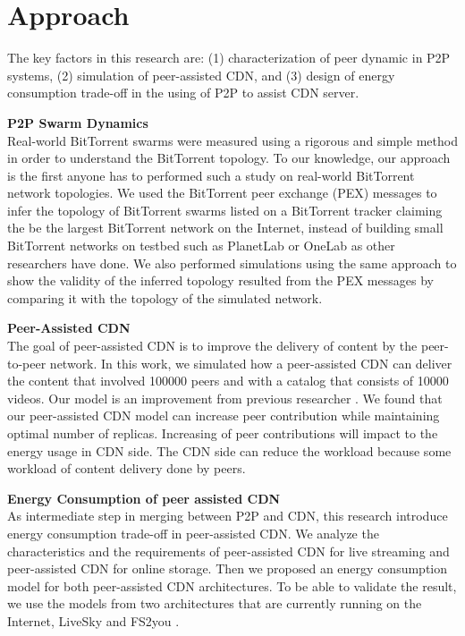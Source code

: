 \section{Approach}
The key factors in this research are: (1) characterization of peer dynamic in P2P systems, (2) simulation of peer-assisted CDN, and (3) design of energy consumption trade-off in the using of P2P to assist CDN server.

\textbf{P2P Swarm Dynamics}\\
Real-world BitTorrent swarms were measured using a rigorous and simple method in order to understand the BitTorrent topology. 
To our knowledge, our approach is the first anyone has to performed such a study on real-world BitTorrent network topologies. 
We used the BitTorrent peer exchange (PEX) messages to infer the topology of BitTorrent swarms listed on a BitTorrent tracker claiming the be the largest BitTorrent network on the Internet, instead of building small BitTorrent networks on testbed such as PlanetLab or OneLab as other researchers have done\cite{dale2008evolution}.
We also performed simulations using the same approach to show the validity of the inferred topology resulted from the PEX messages by comparing it with the topology of the simulated network.

\textbf{Peer-Assisted CDN}\\
The goal of peer-assisted CDN is to improve the delivery of content by the peer-to-peer network.  
In this work, we simulated how a peer-assisted CDN can deliver the content that involved 100000 peers and with a catalog that consists of 10000 videos.
Our model is an improvement from previous researcher \cite{1613869}.
We found that our peer-assisted CDN model can increase peer contribution while maintaining optimal number of replicas.
Increasing of peer contributions will impact to the energy usage in CDN side. 
The CDN side can reduce the workload because some workload of content delivery done by peers.


\textbf{Energy Consumption of peer assisted CDN}\\
As intermediate step in merging between P2P and CDN, this research introduce energy consumption trade-off in peer-assisted CDN. 
We analyze the characteristics and the requirements of peer-assisted CDN for live streaming and peer-assisted CDN for online storage.
Then we proposed an energy consumption model for both peer-assisted CDN architectures.
To be able to validate the result, we use the models from two architectures that are currently running on the Internet, LiveSky \cite{Yin:2010:LEC:1823746.1823750} and FS2you \cite{fs2you}.
 


